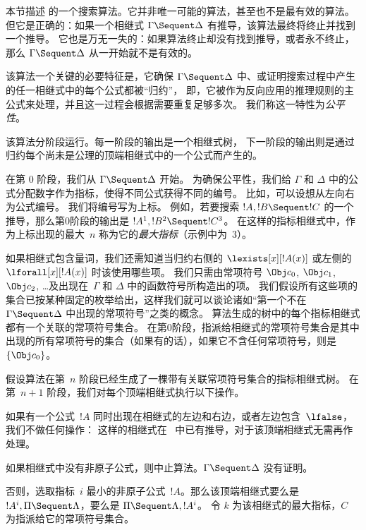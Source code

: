 \documentclass[../../../include/open-logic-section]{subfiles}
\begin{document}


本节描述  的一个搜索算法。它并非唯一可能的算法，甚至也不是最有效的算法。
但它是正确的：如果一个相继式 $\Gamma \Sequent \Delta$ 有推导，该算法最终将终止并找到一个推导。
它也是万无一失的：如果算法终止却没有找到推导，或者永不终止，那么 $\Gamma
\Sequent \Delta$ 从一开始就不是有效的。

该算法一个关键的必要特征是，它确保 $\Gamma \Sequent \Delta$ 中、或证明搜索过程中产生的任一相继式中的每个公式都被“归约”，
即，它被作为反向应用的推理规则的主公式来处理，并且这一过程会根据需要重复足够多次。
我们称这一特性为\emph{公平性}。

该算法分阶段运行。每一阶段的输出是一个相继式树，
下一阶段的输出则是通过归约每个尚未是公理的顶端相继式中的一个公式而产生的。

在第 $0$ 阶段，我们从 $\Gamma \Sequent \Delta$ 开始。
为确保公平性，我们给 $\Gamma$ 和 $\Delta$ 中的公式分配数字作为指标，使得不同公式获得不同的编号。
比如，可以设想从左向右为公式编号。
我们将编号写为上标。
例如，若要搜索 $!A, !B \Sequent !C$ 的一个推导，那么第$0$阶段的输出是 $!A^1, !B^2 \Sequent !C^3$。
在这样的指标相继式中，作为上标出现的最大~$n$ 称为它的\emph{最大指标}（示例中为~$3$）。

如果相继式包含量词，我们还需知道当归约右侧的 $\lexists[x][!A(x)]$ 或左侧的 $\lforall[x][!A(x)]$ 时该使用哪些项。
我们只需由常项符号 $\Obj c_0$, $\Obj c_1$, $\Obj c_2$, \dots 及出现在~$\Gamma$ 和 $\Delta$ 中的函数符号所构造出的项。
我们假设所有这些项的集合已按某种固定的枚举给出，这样我们就可以谈论诸如“第一个不在 $\Gamma \Sequent \Delta$ 中出现的常项符号”之类的概念。
算法生成的树中的每个指标相继式都有一个关联的常项符号集合。
在第$0$阶段，指派给相继式的常项符号集合是其中出现的所有常项符号的集合（如果有的话），如果它不含任何常项符号，则是 $\{\Obj c_0\}$。

假设算法在第~$n$ 阶段已经生成了一棵带有关联常项符号集合的指标相继式树。
在第~$n+1$ 阶段，我们对每个顶端相继式执行以下操作。

如果有一个公式~$!A$ 同时出现在相继式的左边和右边，或者左边包含~$\lfalse$，我们不做任何操作：
这样的相继式在~ 中已有推导，对于该顶端相继式无需再作处理。

如果相继式中没有非原子公式，则中止算法。$\Gamma \Sequent \Delta$ 没有证明。

否则，选取指标~$i$ 最小的非原子公式~$!A$。那么该顶端相继式要么是 $!A^i, \Pi \Sequent \Lambda$，要么是 $\Pi \Sequent \Lambda, !A^i$。
令 $k$ 为该相继式的最大指标，$C$ 为指派给它的常项符号集合。
\end{document}
